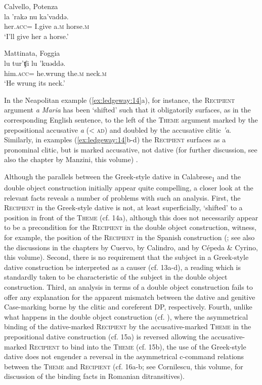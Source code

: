 \documentclass[output=paper,modfonts,nonflat,colorlinks,citecolor=brown]{langsci/langscibook}
\begin{document}
\ex Calvello, Potenza\\
        \gll la  {}'rakǝ  nu  ka'vaddǝ.\\
    her.\textsc{acc}=  I.give  a.\textsc{m}  horse.\textsc{m}\\
    \glt `I’ll give her a horse.'

\ex Mattinata, Foggia\\
    \gll lu  tur'ʧi  lu  {}'kuǝddǝ.\\
    him.\textsc{acc}=  he.wrung  the.\textsc{m}  neck.\textsc{m}\\
    \glt `He wrung its neck.'
    \z
    \z

In the Neapolitan example (\ref{ex:ledgeway:14}a), for instance, the \textsc{Recipient} argument \textit{a Maria} has been `shifted' such that it obligatorily surfaces, as in the corresponding English sentence, to the left of the \textsc{Theme} argument marked by the prepositional accusative \textit{a} ({\textless} \textsc{ad}) and doubled by the accusative clitic \textit{’a}. Similarly, in examples (\ref{ex:ledgeway:14}b-d) the \textsc{Recipient} surfaces as a pronominal clitic, but is marked accusative, not dative (for further discussion, see also the chapter by Manzini, this volume) .

Although the parallels between the Greek-style dative in Calabrese\textsubscript{1} and the double object construction initially appear quite compelling, a closer look at the relevant facts reveals a number of problems with such an analysis. First, the \textsc{Recipient} in the Greek-style dative is not, at least superficially, `shifted' to a position in front of the \textsc{Theme} (cf. 14a), although this does not necessarily appear to be a precondition for the \textsc{Recipient} in the double object construction, witness, for example, the position of the \textsc{Recipient} in the Spanish construction (\citealt{Demonte1995}; see also the discussions in the chapters by Cuervo, by Calindro, and by Cépeda \& Cyrino, this volume). Second, there is no requirement that the subject in a Greek-style dative construction be interpreted as a causer (cf. 13a-d), a reading which is standardly taken to be characteristic of the subject in the double object construction. Third, an analysis in terms of a double object construction fails to offer any explanation for the apparent mismatch between the dative and genitive Case-marking borne by the clitic and coreferent DP, respectively. Fourth, unlike what happens in the double object construction (cf. \citealt{BarssLasnik1986,Larson1988}), where the asymmetrical binding of the dative-marked \textsc{Recipient} by the accusative-marked \textsc{Theme} in the prepositional dative construction (cf. 15a) is reversed allowing the accusative-marked \textsc{Recipient} to bind into the \textsc{Theme} (cf. 15b), the use of the Greek-style dative does not engender a reversal in the asymmetrical c-command relations between the \textsc{Theme} and \textsc{Recipient} (cf. 16a-b; see Cornilescu, this volume, for discussion of the binding facts in Romanian ditransitives).
\end{document}
